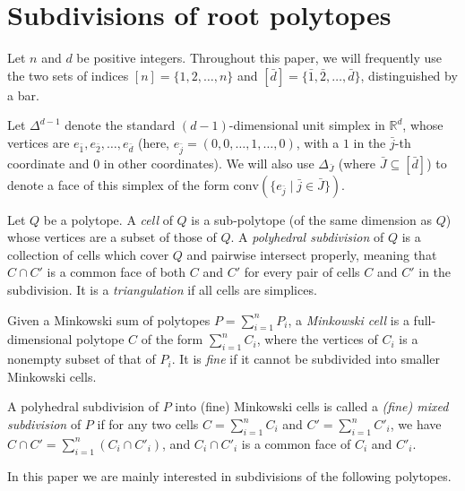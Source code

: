 \documentclass[letterpaper,reqno,11pt]{amsart}
\begin{document}
\section{Subdivisions of root polytopes}\label{sec:subdiv}

Let $n$ and $d$ be positive integers. Throughout this paper, we will frequently use the two sets of indices $[n] = \{1, 2, \dots, n\}$ and $[\bar{d}] = \{\bar{1}, \bar{2}, \dots, \bar{d}\}$, distinguished by a bar.

Let $\Delta^{d-1}$ denote the standard $(d-1)$-dimensional unit simplex in $\mathbb{R}^d$, whose vertices are $e_{\bar{1}}, e_{\bar{2}}, \dots, e_{\bar{d}}$ (here, $e_{\bar{j}} = (0, 0, \dots, 1, \dots, 0)$, with a $1$ in the $\bar{j}$-th coordinate and $0$ in other coordinates). We will also use $\Delta_{\bar{J}}$ (where $\bar{J}\subseteq [\bar{d}]$) to denote a face of this simplex of the form $\text{conv}(\{e_{\bar{j}}\mid \bar{j}\in \bar{J}\})$.

\begin{definition}
    Let $Q$ be a polytope. A \emph{cell} of $Q$ is a sub-polytope (of the same dimension as $Q$) whose vertices are a subset of those of $Q$. A \emph{polyhedral subdivision} of $Q$ is a collection of cells which cover $Q$ and pairwise intersect properly,  meaning that $C\cap C'$ is a common face of both $C$ and $C'$ for every pair of cells $C$ and $C'$ in the subdivision. It is a \emph{triangulation} if all cells are simplices.
\end{definition}

\begin{definition}
    Given a Minkowski sum of polytopes $P = \sum_{i=1}^n P_i$, a \emph{Minkowski cell} is a full-dimensional polytope $C$ of the form $\sum_{i=1}^n C_i$, where the vertices of $C_i$ is a nonempty subset of that of $P_i$. It is \emph{fine} if it cannot be subdivided into smaller Minkowski cells.
     
    A polyhedral subdivision of $P$ into (fine) Minkowski cells is called a \emph{(fine) mixed subdivision} of $P$ if for any two cells $C = \sum_{i=1}^n C_i$ and $C' = \sum_{i=1}^n C'_i$, we have $C \cap C' = \sum_{i=1}^n (C_i \cap C'_i)$, and $C_i \cap C'_i$ is a common face of $C_i$ and $C'_i$.
\end{definition}

In this paper we are mainly interested in subdivisions of the following polytopes.
\end{document}
